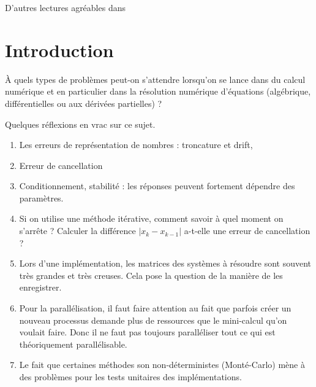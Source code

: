 
D'autres lectures agréables dans \cite{GianlucaB}

\section{Introduction}

À quels types de problèmes peut-on s'attendre lorsqu'on se lance dans du calcul numérique et en particulier dans la résolution numérique d'équations (algébrique, différentielles ou aux dérivées partielles) ?

Quelques réflexions en vrac sur ce sujet.

\begin{enumerate}
    \item
        Les erreurs de représentation de nombres : troncature et drift,
    \item
        Erreur de cancellation
    \item
        Conditionnement, stabilité : les réponses peuvent fortement dépendre des paramètres.
    \item
        Si on utilise une méthode itérative, comment savoir à quel moment on s'arrête ? Calculer la différence \( | x_k-x_{k-1} |\) a-t-elle une erreur de cancellation ?
    \item
        Lors d'une implémentation, les matrices des systèmes à résoudre sont souvent très grandes et très creuses. Cela pose la question de la manière de les enregistrer.
    \item
        Pour la parallélisation, il faut faire attention au fait que parfois créer un nouveau processus demande plus de ressources que le mini-calcul qu'on voulait faire. Donc il ne faut pas toujours paralléliser tout ce qui est théoriquement parallélisable.
    \item
        Le fait que certaines méthodes son non-déterministes (Monté-Carlo) mène à des problèmes pour les tests unitaires des implémentations.
\end{enumerate}

